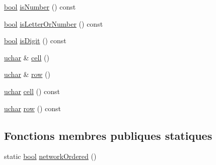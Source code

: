 \begin{DoxyCompactItemize}
\item 
\hyperlink{qglobal_8h_a1062901a7428fdd9c7f180f5e01ea056}{bool} \hyperlink{class_q_char_aefeb204ffe50169a4840d78d669972da}{is\+Number} () const 
\item 
\hyperlink{qglobal_8h_a1062901a7428fdd9c7f180f5e01ea056}{bool} \hyperlink{class_q_char_a58143f94c0ac19ca77077f91642649cd}{is\+Letter\+Or\+Number} () const 
\item 
\hyperlink{qglobal_8h_a1062901a7428fdd9c7f180f5e01ea056}{bool} \hyperlink{class_q_char_ab9e26ae11a1a825dbb176eeb2eb33722}{is\+Digit} () const 
\item 
\hyperlink{qglobal_8h_a65f85814a8290f9797005d3b28e7e5fc}{uchar} \& \hyperlink{class_q_char_a2475b4653bed4cf2a3f10395a14cc9c5}{cell} ()
\item 
\hyperlink{qglobal_8h_a65f85814a8290f9797005d3b28e7e5fc}{uchar} \& \hyperlink{class_q_char_a8f987c65692f95eebc84bf687ea92aff}{row} ()
\item 
\hyperlink{qglobal_8h_a65f85814a8290f9797005d3b28e7e5fc}{uchar} \hyperlink{class_q_char_a6234219a34048a117d22c56e95e125ed}{cell} () const 
\item 
\hyperlink{qglobal_8h_a65f85814a8290f9797005d3b28e7e5fc}{uchar} \hyperlink{class_q_char_a73ed76edf3feca8c211a02abc8b30c82}{row} () const 
\end{DoxyCompactItemize}
\subsection*{Fonctions membres publiques statiques}
\begin{DoxyCompactItemize}
\item 
static \hyperlink{qglobal_8h_a1062901a7428fdd9c7f180f5e01ea056}{bool} \hyperlink{class_q_char_a6412de50d41df09c99e4c93ed4b802dc}{network\+Ordered} ()
\end{DoxyCompactItemize}
